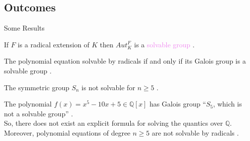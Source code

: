 \documentclass{beamer}
\begin{document}
\subsection{Outcomes}
\begin{frame}{Some Results}

  \begin{theorem}[Theorem]
If \(F\) is a radical extension of \(K\) then \(Aut_K^F\) is a \textcolor{violet}{solvable group} \cite{hunger}.
\end{theorem}

\begin{corollary}[Corollary]
The polynomial equation solvable by radicals if and only if its Galois group is a \textcolor{green!50!black}{solvable group} \cite{hunger}.
\end{corollary}

\begin{theorem}[Theorem]
The symmetric group \(S_n\) is not solvable for \(n \geq 5\) \cite{hunger}.
\end{theorem}

  \begin{tcolorbox}[colback=white, colframe=red, boxsep=1mm, title={\bfseries \color{white} Outcomes}]
  The polynomial \(f(x)=x^5-10x+5 \in \mathbb{Q}[x]\) has Galois group ``\(S_5\), which is not a solvable group'' \cite{hunger}. \\[1mm]
So, there does not exist an explicit formula for solving the quantics over \(\mathbb{Q}\). Moreover, \textcolor{green!50!black}{polynomial equations of degree \(n \geq 5\) are not solvable by radicals} \cite{hunger}.
\end{tcolorbox}

\end{frame}
\end{document}
